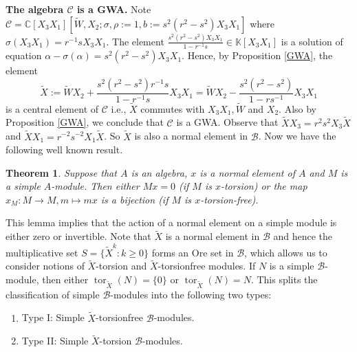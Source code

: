 \documentclass[12 pt,reqno]{amsart}
\numberwithin{equation}{section}
\newcommand{\C}{\mathbb{C}}
\DeclareMathOperator{\tors}{tor}
\newtheorem{thm}{Theorem}[section]
\theoremstyle{definition}
\theoremstyle{definition}
\theoremstyle{remark}
\theoremstyle{remark}
\begin{document}
\textbf{The algebra $\mathcal{C}$ is a GWA.} Note $\mathcal{C}=\C[X_3X_1][\tilde{W}, X_2;\sigma, \rho:=1, b:=s^2(r^2-s^2)X_3X_1]$ where $\sigma(X_3X_1)=r^{-1}sX_3X_1$. The element $\displaystyle\frac{s^2(r^2-s^2)X_3X_1}{1-r^{-1}s} \in \mathbb{K}[X_3X_1]$ is a solution of equation $\alpha-\sigma(\alpha)=s^2(r^2-s^2)X_3X_1$. Hence, by Proposition \ref{GWA}, the element \begin{equation}\label{cen3}
     \tilde{X}:=\tilde{W}X_2+\displaystyle\frac{s^2(r^2-s^2)r^{-1}s}{1-r^{-1}s}X_3X_1=\tilde{W}X_2-\displaystyle\frac{s^2(r^2-s^2)}{1-rs^{-1}}X_3X_1
 \end{equation} is a central element of $\mathcal{C}$ i.e., $\tilde{X}$ commutes with $X_3X_1, \tilde{W}$ and $X_2$. Also by Proposition \ref{GWA}, we conclude that $\mathcal{C}$ is a GWA. Observe that $\tilde{X}X_3=r^2s^2X_3\tilde{X}$ and $\tilde{X}X_1=r^{-2}s^{-2}X_1\tilde{X}$. So $\tilde{X}$ is also a normal element in $\mathcal{B}$. Now we have the following well known result.
 \begin{thm}
     Suppose that $A$ is an algebra, $x$ is a normal element of $A$ and $M$ is a simple $A$-module. Then either $Mx=0$ (if $M$ is $x$-torsion) or the map $x_{M}:M\rightarrow M, m\mapsto mx$ is a bijection (if $M$ is $x$-torsion-free).
 \end{thm}
 This lemma implies that the action of a normal element on a simple module is either zero or invertible. Note that $\tilde{X}$ is a normal element in $\mathcal{B}$ and hence the multiplicative set $S=\{\tilde{X}^k:k\geq 0\}$ forms an Ore set in $\mathcal{B}$, which allows us to consider notions of $\tilde{X}$-torsion and $\tilde{X}$-torsionfree modules. If $N$ is a simple $\mathcal{B}$-module, then either $\tors_{\tilde{X}}(N)=\{0\}$ or $\tors_{\tilde{X}}(N)=N$. This splits the classification of simple $\mathcal{B}$-modules into the following two types:
\begin{enumerate}
    \item[] Type I: Simple $\tilde{X}$-torsionfree $\mathcal{B}$-modules.
    \item[] Type II: Simple $\tilde{X}$-torsion $\mathcal{B}$-modules.
\end{enumerate}
\end{document}

